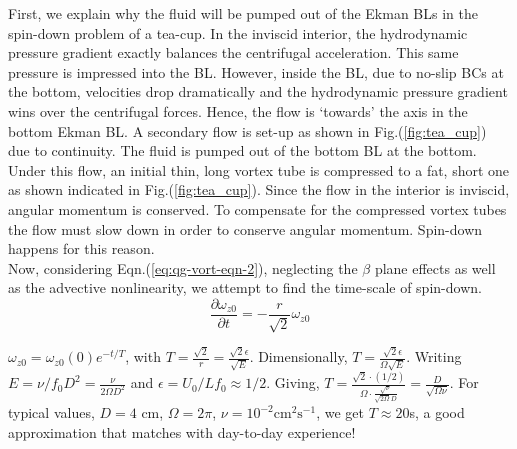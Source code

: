 \documentclass{article}
\newcommand{\pd}[2]{\frac{\partial{#1}}{\partial{#2}}}
\begin{document}
First, we explain why the fluid will be pumped out of the Ekman BLs in the spin-down problem of a tea-cup. In the inviscid interior, the hydrodynamic pressure gradient exactly balances the centrifugal acceleration. This same pressure is impressed into the BL. However, inside the BL, due to no-slip BCs at the bottom, velocities drop dramatically and the hydrodynamic pressure gradient wins over the centrifugal forces. Hence, the flow is `towards' the axis in the bottom Ekman BL. A secondary flow is set-up as shown in Fig.(\ref{fig:tea_cup}) due to continuity. The fluid is pumped out of the bottom BL at the bottom. Under this flow, an initial thin, long vortex tube is compressed to a fat, short one as shown indicated in Fig.(\ref{fig:tea_cup}). Since the flow in the interior is inviscid, angular momentum is conserved. To compensate for the compressed vortex tubes the flow must slow down in order to conserve angular momentum. Spin-down happens for this reason. \\
%
Now, considering Eqn.(\ref{eq:qg-vort-eqn-2}), neglecting the $\beta$ plane effects as well as the advective nonlinearity, we attempt to find the time-scale of spin-down. 
\begin{equation}
 \pd{\omega_{z0}}{t} = - \frac{r}{\sqrt{2}}\omega_{z0} 
\end{equation}

$\omega_{z0} = \omega_{z0}(0)e^{-t/T}$, with $T = \frac{\sqrt{2}}{r} = \frac{\sqrt{2}\epsilon}{\sqrt{E}}$. Dimensionally, $T = \frac{\sqrt{2}\epsilon}{\Omega\sqrt{E}}$. Writing $E = \nu/f_{0}D^{2} = \frac{\nu}{2\Omega D^{2}}$ and $\epsilon = U_{0}/Lf_{0} \approx 1/2$. Giving, $T = \frac{\sqrt{2}\cdot (1/2)}{\Omega \cdot \frac{\sqrt{\nu}}{\sqrt{2\Omega}D}}  = \frac{D}{\sqrt{\Omega \nu}}$. For typical values, $D = 4$ cm, $\Omega = 2\pi$, $\nu = 10^{-2} \textrm{cm}^{2}\textrm{s}^{-1}$, we get $T \approx 20$s, a good approximation that matches with day-to-day experience!



 \if@openright\cleardoublepage\else\clearpage\fi
 \cleardoublepage
 \pagestyle{empty}
\end{document}
